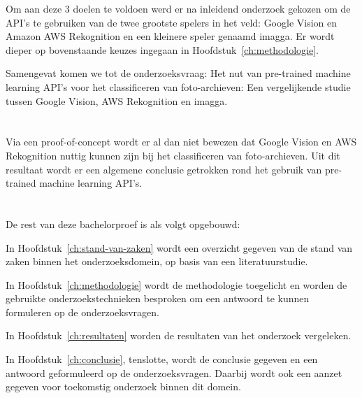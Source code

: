 Om aan deze 3 doelen te voldoen werd er na inleidend onderzoek gekozen om de API's te gebruiken van de twee grootste spelers in het veld: Google Vision en Amazon AWS Rekognition en een kleinere speler genaamd imagga. Er wordt dieper op bovenstaande keuzes ingegaan in Hoofdstuk~\ref{ch:methodologie}.

Samengevat komen we tot de onderzoeksvraag: Het nut van pre-trained machine learning API's voor het classificeren van foto-archieven: Een vergelijkende studie tussen Google Vision, AWS Rekognition en imagga.

\section{}
\label{sec:onderzoeksdoelstelling}

Via een proof-of-concept wordt er al dan niet bewezen dat Google Vision en AWS Rekognition nuttig kunnen zijn bij het classificeren van foto-archieven. Uit dit resultaat wordt er een algemene conclusie getrokken rond het gebruik van pre-trained machine learning API's.

\section{}
\label{sec:opzet-bachelorproef}


De rest van deze bachelorproef is als volgt opgebouwd:

In Hoofdstuk~\ref{ch:stand-van-zaken} wordt een overzicht gegeven van de stand van zaken binnen het onderzoeksdomein, op basis van een literatuurstudie.

In Hoofdstuk~\ref{ch:methodologie} wordt de methodologie toegelicht en worden de gebruikte onderzoekstechnieken besproken om een antwoord te kunnen formuleren op de onderzoeksvragen.

In Hoofdstuk~\ref{ch:resultaten} worden de resultaten van het onderzoek vergeleken.


In Hoofdstuk~\ref{ch:conclusie}, tenslotte, wordt de conclusie gegeven en een antwoord geformuleerd op de onderzoeksvragen. Daarbij wordt ook een aanzet gegeven voor toekomstig onderzoek binnen dit domein.